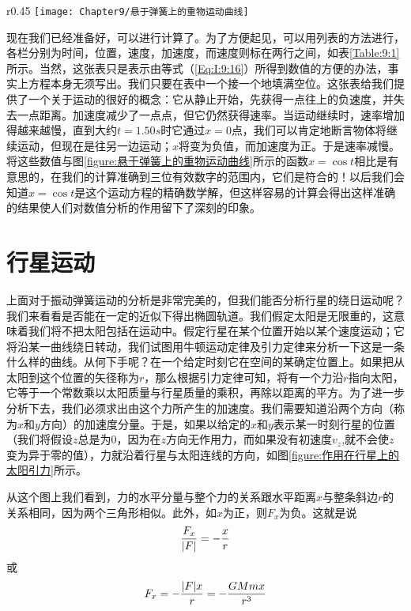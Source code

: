 \begin{wrapfigure}{r}{0.45\textwidth}
    \centering
    \texttt{[image: Chapter9/悬于弹簧上的重物运动曲线]}
    \caption{悬于弹簧上的重物运动曲线}
    \label{figure:悬于弹簧上的重物运动曲线}
\end{wrapfigure}
现在我们已经准备好，可以进行计算了。为了方便起见，可以用列表的方法进行，各栏分别为时间，位置，速度，加速度，而速度则标在两行之间，如表\ref{Table:9:1}所示。当然，这张表只是表示由等式（\ref{Eq:I:9:16}）所得到数值的方便的办法，事实上方程本身无须写出。我们只要在表中一个接一个地填满空位。这张表给我们提供了一个关于运动的很好的概念：它从静止开始，先获得一点往上的负速度，并失去一点距离。加速度减少了一点点，但它仍然获得速率。当运动继续时，速率增加得越来越慢，直到大约$t=1.50s$时它通过$x=0$点，我们可以肯定地断言物体将继续运动，但现在是往另一边运动；$x$将变为负值，而加速度为正。于是速率减慢。将这些数值与图\ref{figure:悬于弹簧上的重物运动曲线}所示的函数$x=\cos t$相比是有意思的，在我们的计算准确到三位有效数字的范围内，它们是符合的！以后我们会知道$x=\cos t$是这个运动方程的精确数学解，但这样容易的计算会得出这样准确的结果使人们对数值分析的作用留下了深刻的印象。

\section{行星运动}

上面对于振动弹簧运动的分析是非常完美的，但我们能否分析行星的绕日运动呢？我们来看看是否能在一定的近似下得出椭圆轨道。我们假定太阳是无限重的，这意味着我们将不把太阳包括在运动中。假定行星在某个位置开始以某个速度运动；它将沿某一曲线绕日转动，我们试图用牛顿运动定律及引力定律来分析一下这是一条什么样的曲线。从何下手呢？在一个给定时刻它在空间的某确定位置上。如果把从太阳到这个位置的矢径称为$r$，那么根据引力定律可知，将有一个力沿$r$指向太阳，它等于一个常数乘以太阳质量与行星质量的乘积，再除以距离的平方。为了进一步分析下去，我们必须求出由这个力所产生的加速度。我们需要知道沿两个方向（称为$x$和$y$方向）的加速度分量。于是，如果以给定的$x$和$y$表示某一时刻行星的位置（我们将假设$z$总是为0，因为在$z$方向无作用力，而如果没有初速度$v_z$,就不会使$z$变为异于零的值），力就沿着行星与太阳连线的方向，如图\ref{figure:作用在行星上的太阳引力}所示。

从这个图上我们看到，力的水平分量与整个力的关系跟水平距离$x$与整条斜边$r$的关系相同，因为两个三角形相似。此外，如$x$为正，则$F_x$为负。这就是说
\begin{equation*}
    \frac{F_x}{\lvert F\rvert}=-\frac{x}{r}
\end{equation*}
或
\begin{equation*}
    F_x=-\frac{\lvert F\rvert x}{r}=-\frac{GMmx}{r^3}
\end{equation*}


